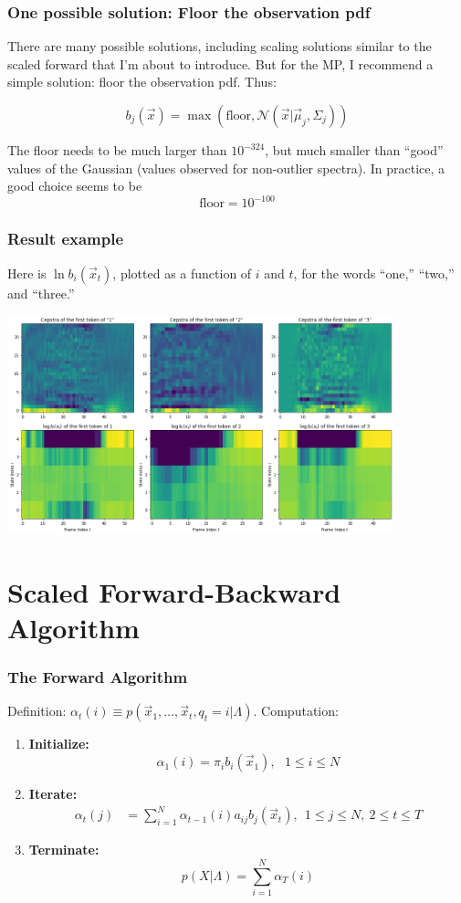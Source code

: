 \documentclass{beamer}
\begin{document}
\begin{frame}
  \frametitle{One possible solution: Floor the observation pdf}

  There are many possible solutions, including scaling solutions
  similar to the scaled forward that I'm about to introduce.  But for
  the MP, I recommend a simple solution: floor the observation pdf.  Thus:

  \begin{displaymath}
    b_j(\vec{x}) = \max\left(\mbox{floor}, {\mathcal N}(\vec{x}|\vec\mu_j,\Sigma_j)\right)
  \end{displaymath}

  The floor needs to be much larger than $10^{-324}$, but much smaller
  than ``good'' values of the Gaussian (values observed for
  non-outlier spectra).  In  practice, a good choice seems to be
  \[
  \mbox{floor}=10^{-100}
  \]
\end{frame}

\begin{frame}
  \frametitle{Result example}

  Here is $\ln b_i(\vec{x}_t)$, plotted as a function of $i$ and $t$,
  for the words ``one,'' ``two,'' and ``three.''
  \centerline{\includegraphics[height=2.5in]{log_b.png}}
\end{frame}

\section[Scaling]{Scaled Forward-Backward Algorithm}
\setcounter{subsection}{1}

\begin{frame}
  \frametitle{The Forward Algorithm}

  Definition: $\alpha_t(i) \equiv p(\vec{x}_1,\ldots,\vec{x}_t,q_t=i|\Lambda)$.  Computation:
  \begin{enumerate}
  \item {\bf Initialize:}
    \[
    \alpha_1(i) = \pi_i b_i(\vec{x}_1),~~~1\le i\le N
    \]
  \item {\bf Iterate:}
    \begin{align*}
      \alpha_{t}(j) &= \sum_{i=1}^N \alpha_{t-1}(i) a_{ij}b_j(\vec{x}_t),~~1\le j\le N,~2\le t\le T
    \end{align*}
  \item {\bf Terminate:}
    \[
    p(X|\Lambda) = \sum_{i=1}^N \alpha_T(i)
    \]
  \end{enumerate}
\end{frame}
\end{document}

